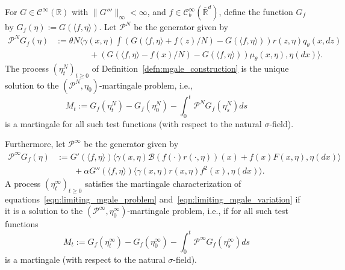 \documentclass[EJP]{ejpecp} %
\newcommand{\IR}{\mathbb R}
\newcommand{\Pgen}{\mathcal{P}}    %
\begin{document}
\begin{lemma}
    \label{def: MP definition of limit}
For $G \in \mathcal{C}^{\infty}(\IR)$ with $\|G'''\|_\infty<\infty$,
and 
$f \in \mathcal{C}_{b}^\infty(\overline{\IR}^d)$, define the 
function $G_f$ by 
$G_f(\eta):=G (\langle f, \eta \rangle)$.
Let $\Pgen^N$ be the generator given by
\begin{equation}
\begin{aligned}
    \Pgen^N G_f(\eta)
    &:=
    \theta N \bigg\langle
    \gamma(x, \eta)
        \int 
        \left(G(\langle f, \eta \rangle + f(z)/N) - G(\langle f, \eta \rangle)\right)
        r(z,\eta) q_\theta(x,dz)
    \\ & \qquad \qquad {}
    +
    \left(G(\langle f, \eta \rangle - f(x)/N) - G(\langle f, \eta \rangle)\right)
    \mu_\theta(x, \eta),
    \eta(dx) \bigg\rangle .
\end{aligned}
\end{equation}
The process $(\eta^N_t)_{t \geq 0}$ of Definition~\ref{defn:mgale_construction}
is the unique solution to the $(\Pgen^N, \eta_0)$-martingale problem, i.e.,
$$
    M_t :=
    G_f(\eta^N_t) - G_f(\eta^N_0)
    - \int_{0}^{t}\Pgen^N G_f(\eta^N_s)ds
$$
is a martingale for all such test functions (with respect to the natural $\sigma$-field). 

Furthermore, let $\Pgen^\infty$ be the generator given by
\begin{equation}
    \label{eq: Limit Generator Definition}
\begin{aligned}
\Pgen^{\infty} G_f(\eta)
    &:= G'(\langle f, \eta \rangle)
                   \big\langle
                        \gamma(x, \eta)
                            \mathcal{B}\left(
                            f(\cdot) r(\cdot, \eta)
                            \right)(x)
                    +
                    f(x) F(x, \eta),
                    \eta(dx)
                    \big\rangle \\
               &\qquad {}
               + \alpha G''(\langle f, \eta \rangle)
                  \big\langle
                    \gamma\left( x, \eta \right)
                    r\left(x,\eta \right)
                    f^2(x),
                    \eta (dx)
                    \big\rangle  .
\end{aligned}    
\end{equation}
A process $(\eta^{\infty}_t)_{t \geq 0}$ 
satisfies the martingale characterization of equations~\eqref{eqn:limiting_mgale_problem}
and~\eqref{eqn:limiting_mgale_variation}
if it is a solution %
to the $(\Pgen^{\infty}, \eta^\infty_0)$-martingale problem, i.e.,
if for all such test functions 
$$
    M_t :=
    G_f(\eta^{\infty}_t) - G_f(\eta^\infty_0)
    - \int_{0}^{t}\Pgen^{\infty}G_f(\eta^{\infty}_s)ds
$$
is a martingale (with respect to the natural $\sigma$-field). 
\end{lemma}
\end{document}
